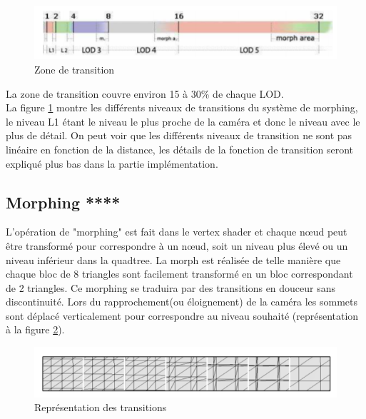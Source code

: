 \begin{figure}[!ht]
    \includegraphics[width=12cm]{img/morph-area.png}
    \caption[morph-area]{Zone de transition \protect\footnotemark}
    \label{fig:morph-area}
\end{figure}
    
    La zone de transition couvre environ 15 à 30\% de chaque LOD.\\
    
    La figure \ref{fig:morph-area} montre les différents niveaux de transitions du système de morphing,
    le niveau L1 étant le niveau le plus proche de la caméra et donc le niveau avec le plus de détail.
    On peut voir que les différents niveaux de transition ne sont pas linéaire en fonction de la distance,
    les détails de la fonction de transition seront expliqué plus bas dans la partie implémentation.
    
\subsection{Morphing ****}
\label{subsec:morphing}

  L'opération de "morphing" est fait dans le vertex shader et chaque n\oe{}ud peut être transformé pour correspondre à un n\oe{}ud, soit un niveau plus élevé ou un niveau inférieur dans la quadtree. La morph est réalisée de telle manière que chaque bloc de 8 triangles sont  facilement transformé en un bloc correspondant de 2 triangles. Ce morphing se traduira par des transitions en douceur sans discontinuité.
  Lors du rapprochement(ou éloignement) de la caméra les sommets sont déplacé verticalement pour correspondre au niveau souhaité (représentation à la figure \ref{fig:morph-transition}).
\begin{figure}[!ht]
    \includegraphics[width=12cm]{img/morph-transition.png}
    \caption[morph-transition]{Représentation des transitions \protect\footnotemark}
    \label{fig:morph-transition}
    \end{figure}


